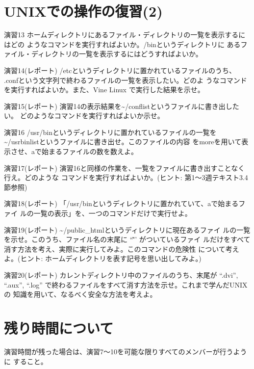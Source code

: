 \documentclass[a4j,10pt]{jarticle}
\begin{document}
\section{UNIXでの操作の復習(2)}
\begin{itembox}{演習13}
 ホームディレクトリにあるファイル・ディレクトリの一覧を表示するにはどの
 ようなコマンドを実行すればよいか。{\sffamily /bin}というディレクトリに
 あるファイル・ディレクトリの一覧を表示するにはどうすればよいか。
\end{itembox}
\begin{itembox}{演習14(レポート)}
 {\sffamily /etc}というディレクトリに置かれているファイルのうち、
 {\sffamily .conf}という文字列で終わるファイルの一覧を表示したい。どのよ
 うなコマンドを実行すればよいか。また、Vine Linux で実行した結果を示せ。
\end{itembox}
\begin{itembox}{演習15(レポート)}
 演習14の表示結果を{\sffamily \~{}/conflist}というファイルに書き出したい。
 どのようなコマンドを実行すればよいか示せ。
\end{itembox}
\begin{itembox}{演習16}
 {\sffamily /usr/bin}というディレクトリに置かれているファイルの一覧を
 {\sffamily \~{}/usrbinlist}というファイルに書き出せ。このファイルの内容
 を{\sffamily more}を用いて表示させ、aで始まるファイルの数を数えよ。
\end{itembox}
\begin{itembox}{演習17(レポート)}
 演習16と同様の作業を、一覧をファイルに書き出すことなく行え。どのような
 コマンドを実行すればよいか。(ヒント: 第1〜3週テキスト3.4節参照)
\end{itembox}
\begin{itembox}{演習18(レポート)}
 「{\sffamily /usr/bin}というディレクトリに置かれていて、aで始まるファイ
 ルの一覧の表示」を、一つのコマンドだけで実行せよ。
\end{itembox}
\begin{itembox}{演習19(レポート)}
 {\sffamily \~{}{\slash}public\_html}というディレクトリに現在あるファイ
 ルの一覧を示せ。このうち、ファイル名の末尾に ``\~'' がついているファイ
 ルだけをすべて消す方法を考え、実際に実行してみよ。このコマンドの危険性
 について考えよ。(ヒント: ホームディレクトリを表す記号を思い出してみよ。)
\end{itembox}
\begin{itembox}{演習20(レポート)}
 カレントディレクトリ中のファイルのうち、末尾が ``.dvi'', ``.aux'',
 ``.log'' で終わるファイルをすべて消す方法を示せ。これまで学んだUNIXの
 知識を用いて、なるべく安全な方法を考えよ。
\end{itembox}
\section{残り時間について}
演習時間が残った場合は、演習7〜10を可能な限りすべてのメンバーが行うように
すること。
\end{document}
